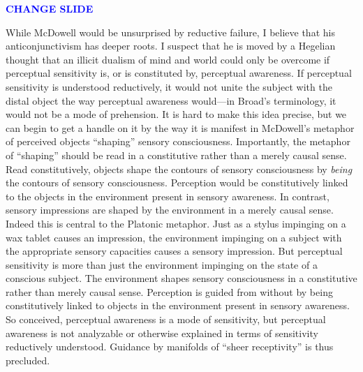 \documentclass[12pt]{article}
\newcommand{\change}{\textcolor{blue}{\textbf{CHANGE SLIDE}}}
\begin{document}
\change

While McDowell would be unsurprised by reductive failure, I believe that his anticonjunctivism has deeper roots. I suspect that he is moved by a Hegelian thought that an illicit dualism of mind and world could only be overcome if perceptual sensitivity is, or is constituted by, perceptual awareness. If perceptual sensitivity is understood reductively, it would not unite the subject with the distal object the way perceptual awareness would---in Broad's terminology, it would not be a mode of prehension. It is hard to make this idea precise, but we can begin to get a handle on it by the way it is manifest in McDowell's metaphor of perceived objects ``shaping'' sensory consciousness. Importantly, the metaphor of ``shaping'' should be read in a constitutive rather than a merely causal sense. %
Read constitutively, objects shape the contours of sensory consciousness by \emph{being} the contours of sensory consciousness. Perception would be constitutively linked to the objects in the environment present in sensory awareness. In contrast, sensory impressions are shaped by the environment in a merely causal sense. Indeed this is central to the Platonic metaphor. Just as a stylus impinging on a wax tablet causes an impression, the environment impinging on a subject with the appropriate sensory capacities causes a sensory impression. But perceptual sensitivity is more than just the environment impinging on the state of a conscious subject. The environment shapes sensory consciousness in a constitutive rather than merely causal sense. Perception is guided from without by being constitutively linked to objects in the environment present in sensory awareness. So conceived, perceptual awareness is a mode of sensitivity, but perceptual awareness is not analyzable or otherwise explained in terms of sensitivity reductively understood. Guidance by manifolds of ``sheer receptivity'' is thus precluded.
\end{document}
